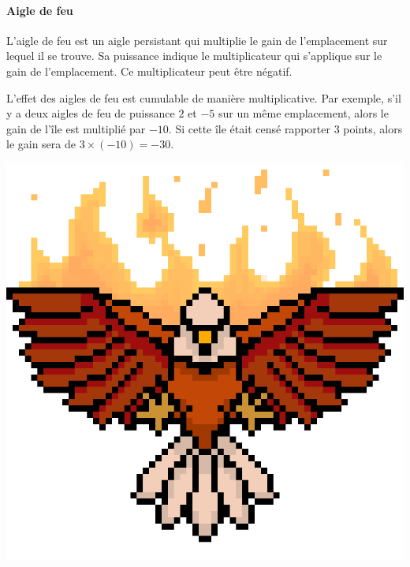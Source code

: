 \begin{minipage}{.75\textwidth}
    \paragraph{Aigle de feu}
    L'aigle de feu est un aigle persistant qui multiplie le gain de l'emplacement
    sur lequel il se trouve.
    Sa puissance indique le multiplicateur qui s'applique sur le gain de
    l'emplacement.
    Ce multiplicateur peut être négatif.

    L'effet des aigles de feu est cumulable de manière multiplicative.
    Par exemple, s'il y a deux aigles de feu de puissance $2$ et $-5$ sur un même
    emplacement, alors le gain de l'île est multiplié par $-10$.
    Si cette île était censé rapporter 3 points, alors le gain sera de
    $3 \times (-10) = -30$.
\end{minipage}
\begin{minipage}{.2\textwidth}
    \centering
    \includegraphics[width=.8\textwidth]{img/sprites/aigle_feu.png}
\end{minipage}

